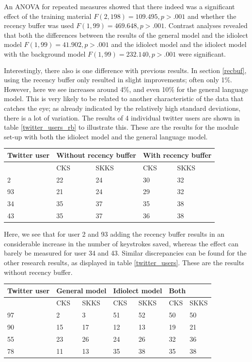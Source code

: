 \documentclass[12pt]{article}
\let\originaltable\table
\let\endoriginaltable\endtable
\renewenvironment{table}[1][ht]{%
  \originaltable[#1]
  \centering}%
  {\endoriginaltable}
\begin{document}
An ANOVA for repeated measures showed that there indeed was a significant effect of the training material $F(2,198) = 109.495, p > .001$ and whether the recency buffer was used $F(1,99) = 469.648, p > .001$. Contrast analyses revealed that both the differences between the results of the general model and the idiolect model $F(1,99) = 41.902, p > .001$ and the idiolect model and the idiolect model with the background model $F(1,99) = 232.140, p > .001$ were significant.

Interestingly, there also is one difference with previous results. In section \ref{recbuf}, using the recency buffer only resulted in slight improvements; often only 1\%. However, here we see increases around 4\%, and even 10\% for the general language model. This is very likely to be related to another characteristic of the data that catches the eye; as already indicated by the relatively high standard deviations, there is a lot of variation. The results of 4 individual twitter users are shown in table \ref{twitter_users_rb} to illustrate this. These are the results for the module set-up with both the idiolect model and the general language model.

\begin{table}[H] 
\centering
\begin{tabular}{l|llll} 
Twitter user&\multicolumn{2}{l}{Without recency buffer}&\multicolumn{2}{l}{With recency buffer}\\
\hline
&CKS&SKKS&CKS&SKKS\\
2&22&24&30&32\\
93&21&24&29&32\\
34&35&37&35&38\\
43&35&37&36&38\\
\end{tabular} 
\caption{Percentage of keystrokes saved for 4 individual Twitter users, with and without the recency buffer} \label{twitter_users_rb}
\end{table}

Here, we see that for user 2 and 93 adding the recency buffer results in an considerable increase in the number of keystrokes saved, whereas the effect can barely be measured for user 34 and 43. Similar discrepancies can be found for the other research results, as displayed in table \ref{twitter_users}. These are the results without recency buffer.

\begin{table}[H] 
\centering
\begin{tabular}{l|llllll} 
Twitter user&\multicolumn{2}{l}{General model}&\multicolumn{2}{l}{Idiolect model}&\multicolumn{2}{l}{Both}\\
\hline
&CKS&SKKS&CKS&SKKS&CKS&SKKS\\
97&2&3&51&52&50&50\\
90&15&17&12&13&19&21\\
55&23&26&24&26&32&36\\
78&11&13&35&38&35&38\\
\end{tabular} 
\caption{Percentage of keystrokes saved for 4 individual Twitter users, for the idiolect and the general model} \label{twitter_users}
\end{table}
\end{document}
